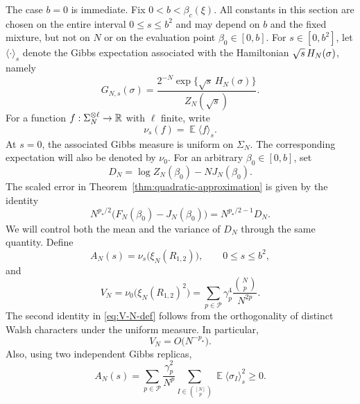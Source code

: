 \documentclass[letterpaper,11pt,reqno]{amsart}
\renewcommand{\leq}{\leqslant}
\renewcommand{\geq}{\geqslant}
\newcommand{\cP}{\mathcal{P}}\newcommand{\cQ}{\mathcal{Q}}\newcommand{\cR}{\mathcal{R}}
\DeclareMathOperator{\E}{\mathds{E}}
\begin{document}
The case $b=0$ is immediate. Fix $0<b<\beta_c(\xi)$. All constants in this section are chosen on the entire interval $0\leq s\leq b^2$ and may depend on $b$ and the fixed mixture, but not on $N$ or on the evaluation point $\beta_0\in[0,b]$. For $s\in[0,b^2]$, let $\langle\cdot\rangle_s$ denote the
Gibbs expectation associated with the Hamiltonian $\sqrt{s}\,H_N(\sigma)$,
namely
\begin{equation}
G_{N,s}(\sigma)
=
\frac{2^{-N}\exp\{\sqrt{s}\,H_N(\sigma)\}}
{Z_N(\sqrt{s})}.
\label{eq:Gibbs-s}
\end{equation}
For a function $f: \Sigma_N^{\otimes \ell} \to \mathbb{R}$ with $\ell$ finite, write
\begin{equation}
\nu_s(f)=\E\langle f\rangle_s.
\label{eq:nu-s}
\end{equation}
At $s=0$, the associated Gibbs measure is uniform on $\Sigma_N$. The
corresponding expectation will also be denoted by $\nu_0$. For an arbitrary $\beta_0\in[0,b]$, set
\begin{equation}
D_N
=
\log Z_N(\beta_0)-N J_N(\beta_0).
\label{eq:D-N-beta0}
\end{equation}
The scaled error in Theorem~\ref{thm:quadratic-approximation} is given by the identity 
\begin{equation}
N^{p_\star/2}
\bigl(F_N(\beta_0)-J_N(\beta_0)\bigr)
=
N^{p_\star/2-1}D_N.
\label{eq:scaled-D-N}
\end{equation}
We will control both the mean and the variance of $D_N$ through the
same quantity. Define
\begin{equation}
A_N(s)
=
\nu_s\bigl(\xi_N(R_{1,2})\bigr),
\qquad
0\leq s\leq b^2,
\label{eq:A-N-def}
\end{equation}
and
\begin{equation}
V_N
=
\nu_0\bigl(\xi_N(R_{1,2})^2\bigr)
=
\sum_{p\in\cP}
\gamma_p^4\frac{\binom Np}{N^{2p}}.
\label{eq:V-N-def}
\end{equation}
The second identity in \eqref{eq:V-N-def} follows from the
orthogonality of distinct Walsh characters under the uniform measure.
In particular,
\begin{equation}
V_N=O\bigl(N^{-p_\star}\bigr).
\label{eq:V-N-order}
\end{equation}
Also, using two independent Gibbs replicas,
\begin{equation}
A_N(s)
=
\sum_{p\in\cP}
\frac{\gamma_p^2}{N^p}
\sum_{I\in\binom{[N]}p}
\E\langle\sigma_I\rangle_s^2
\geq 0.
\label{eq:A-N-positive}
\end{equation}
\end{document}
